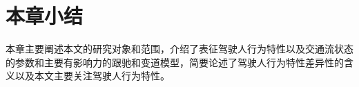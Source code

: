 % 
% 
 
%


\section{本章小结}
本章主要阐述本文的研究对象和范围，介绍了表征驾驶人行为特性以及交通流状态的参数和主要有影响力的跟驰和变道模型，简要论述了驾驶人行为特性差异性的含义以及本文主要关注驾驶人行为特性。
